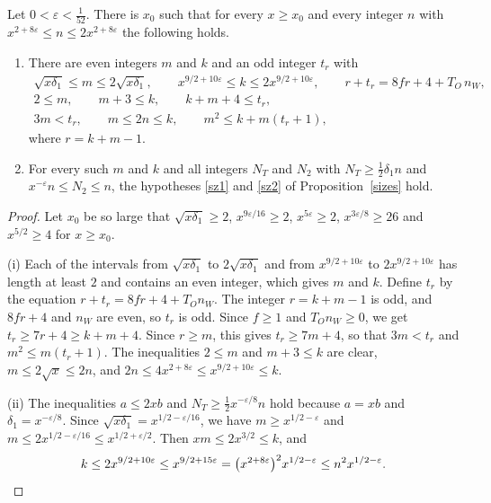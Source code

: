 \begin{proposition}\label{ranks}
Let $0<\varepsilon<\frac1{52}$. There is $x_0$ such that for every $x\ge x_0$ and every integer $n$ with $x^{2+8\varepsilon}\le n\le2x^{2+8\varepsilon}$ the following holds.
\begin{enumerate}
\item[(i)] There are even integers $m$ and $k$ and an odd integer $t_r$ with
\begin{gather*}
\sqrt{x\delta_1}\le m\le2\sqrt{x\delta_1},\qquad x^{9/2+10\varepsilon}\le k\le2x^{9/2+10\varepsilon},\qquad r+t_r=8fr+4+T_O\,n_W,\\
2\le m,\qquad m+3\le k,\qquad k+m+4\le t_r,\\
3m<t_r,\qquad m\le2n\le k,\qquad m^2\le k+m(t_r+1),
\end{gather*}
where $r=k+m-1$.
\item[(ii)] For every such $m$ and $k$ and all integers $N_T$ and $N_2$ with $N_T\ge\frac12\delta_1n$ and $x^{-\varepsilon}n\le N_2\le n$, the hypotheses \eqref{sz1} and \eqref{sz2} of Proposition~\ref{sizes} hold.
\end{enumerate}
\end{proposition}

\begin{proof}
Let $x_0$ be so large that $\sqrt{x\delta_1}\ge2$, $x^{9\varepsilon/16}\ge2$, $x^{5\varepsilon}\ge2$, $x^{3\varepsilon/8}\ge26$ and $x^{5/2}\ge4$ for $x\ge x_0$.

(i) Each of the intervals from $\sqrt{x\delta_1}$ to $2\sqrt{x\delta_1}$ and from $x^{9/2+10\varepsilon}$ to $2x^{9/2+10\varepsilon}$ has length at least $2$ and contains an even integer, which gives $m$ and $k$. Define $t_r$ by the equation $r+t_r=8fr+4+T_On_W$. The integer $r=k+m-1$ is odd, and $8fr+4$ and $n_W$ are even, so $t_r$ is odd. Since $f\ge1$ and $T_On_W\ge0$, we get $t_r\ge7r+4\ge k+m+4$. Since $r\ge m$, this gives $t_r\ge7m+4$, so that $3m<t_r$ and $m^2\le m(t_r+1)$. The inequalities $2\le m$ and $m+3\le k$ are clear, $m\le2\sqrt x\le2n$, and $2n\le4x^{2+8\varepsilon}\le x^{9/2+10\varepsilon}\le k$.

(ii) The inequalities $a\le2xb$ and $N_T\ge\frac12x^{-\varepsilon/8}n$ hold because $a=xb$ and $\delta_1=x^{-\varepsilon/8}$. Since $\sqrt{x\delta_1}=x^{1/2-\varepsilon/16}$, we have $m\ge x^{1/2-\varepsilon}$ and $m\le2x^{1/2-\varepsilon/16}\le x^{1/2+\varepsilon/2}$. Then $xm\le2x^{3/2}\le k$, and
\[
k\le2x^{9/2+10\varepsilon}\le x^{9/2+15\varepsilon}=\big(x^{2+8\varepsilon}\big)^2x^{1/2-\varepsilon}\le n^2x^{1/2-\varepsilon}.\qedhere
\]
\end{proof}

